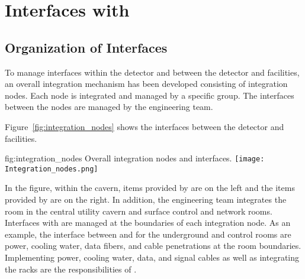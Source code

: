 \chapter{Interfaces with }
\label{vl:tc-lbnf}

\section{Organization of Interfaces}
\label{sec:inter-org-interf}
To manage interfaces within the detector and between the
detector and facilities, an overall integration mechanism has been
developed consisting of integration nodes. Each node is integrated
and managed by a specific group. The interfaces between the nodes are
managed by the  engineering team.

Figure~\ref{fig:integration_nodes} shows the interfaces between the
detector and facilities.
\begin{dunefigure}{fig:integration_nodes}
  {Overall integration nodes and interfaces.}
  \texttt{[image: Integration\_nodes.png]}
\end{dunefigure}
In the figure, within the cavern, items provided by  are
on the left and the items provided by  are on the right. In addition, the  engineering team integrates the  room in the central utility
cavern and surface control and network rooms. Interfaces with  are
managed at the boundaries of each integration node. As an example, the
interface between  and  for the underground  and control
rooms are power, cooling water, data fibers, and cable penetrations at the
room boundaries. Implementing power, cooling water, data, and
signal cables as well as integrating the racks are the responsibilities of .


